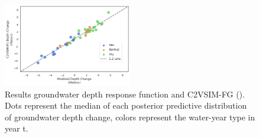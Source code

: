 \documentclass[11pt,a4paper]{article}
\begin{document}
\begin{figure}[H]
    \centering
    \includegraphics[width=0.5\textwidth]{results_gw_depth_response_calib.png}
    \caption{Results groundwater depth response function and C2VSIM-FG (\cite{dwr_c2vsimfg_2021}). Dots represent the median of each posterior predictive distribution of groundwater depth change, colors represent the water-year type in year t.}
    \label{fig:mesh1}
\end{figure}







\newpage
\printbibliography
\end{document}
